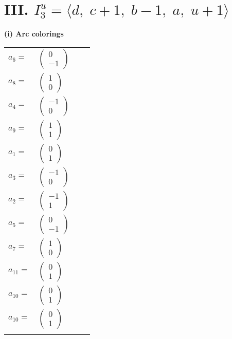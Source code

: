 \documentclass[1p]{elsarticle_modified}
\theoremstyle{definition}
\begin{document}
\centering \section*{III. $I^u_{3}= \langle d,\;c+1,\;b-1,\;a,\;u+1 \rangle$}
\flushleft \textbf{(i) Arc colorings}\\
\begin{tabular}{m{7pt} m{180pt} m{7pt} m{180pt} }
\flushright $a_{6}=$&$\begin{pmatrix}0\\-1\end{pmatrix}$ \\
\flushright $a_{8}=$&$\begin{pmatrix}1\\0\end{pmatrix}$ \\
\flushright $a_{4}=$&$\begin{pmatrix}-1\\0\end{pmatrix}$ \\
\flushright $a_{9}=$&$\begin{pmatrix}1\\1\end{pmatrix}$ \\
\flushright $a_{1}=$&$\begin{pmatrix}0\\1\end{pmatrix}$ \\
\flushright $a_{3}=$&$\begin{pmatrix}-1\\0\end{pmatrix}$ \\
\flushright $a_{2}=$&$\begin{pmatrix}-1\\1\end{pmatrix}$ \\
\flushright $a_{5}=$&$\begin{pmatrix}0\\-1\end{pmatrix}$ \\
\flushright $a_{7}=$&$\begin{pmatrix}1\\0\end{pmatrix}$ \\
\flushright $a_{11}=$&$\begin{pmatrix}0\\1\end{pmatrix}$ \\
\flushright $a_{10}=$&$\begin{pmatrix}0\\1\end{pmatrix}$\\ \flushright $a_{10}=$&$\begin{pmatrix}0\\1\end{pmatrix}$\\&\end{tabular}
\end{document}
